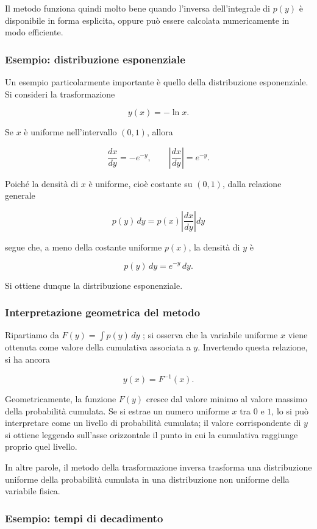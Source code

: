 Il metodo funziona quindi molto bene quando l'inversa dell'integrale di $p(y)$ è disponibile in forma esplicita, oppure può essere calcolata numericamente in modo efficiente. 




\subsubsection{Esempio: distribuzione esponenziale}

Un esempio particolarmente importante è quello della distribuzione esponenziale. Si consideri la trasformazione

\[
y(x) = -\ln x .
\]

Se $x$ è uniforme nell'intervallo $(0,1)$, allora

\[
\frac{dx}{dy} = -e^{-y},
\qquad
\left|\frac{dx}{dy}\right| = e^{-y}.
\]

Poiché la densità di $x$ è uniforme, cioè costante su $(0,1)$, dalla relazione generale

\[
p(y)\,dy = p(x)\left|\frac{dx}{dy}\right|dy
\]

segue che, a meno della costante uniforme $p(x)$, la densità di $y$ è

\[
p(y)\,dy = e^{-y}\,dy .
\]

Si ottiene dunque la distribuzione esponenziale. 


%
%
%
\subsubsection{Interpretazione geometrica del metodo}

Ripartiamo da $F(y) = \int p(y)\,dy$ ; si osserva che la variabile uniforme $x$ viene ottenuta come valore della cumulativa associata a $y$. Invertendo questa relazione, si ha ancora

\[
y(x) = F^{-1}(x).
\]

Geometricamente, la funzione $F(y)$ cresce dal valore minimo al valore massimo della probabilità cumulata. Se si estrae un numero uniforme $x$ tra $0$ e $1$, lo si può interpretare come un livello di probabilità cumulata; il valore corrispondente di $y$ si ottiene leggendo sull'asse orizzontale il punto in cui la cumulativa raggiunge proprio quel livello.

In altre parole, il metodo della trasformazione inversa trasforma una distribuzione uniforme della probabilità cumulata in una distribuzione non uniforme della variabile fisica.

\subsubsection{Esempio: tempi di decadimento}

